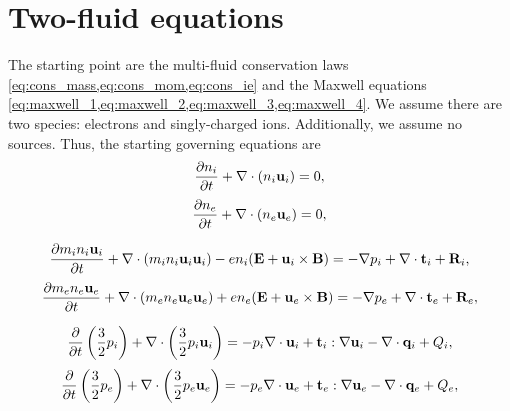 \documentclass[oneside,a4paper,11pt]{report}
\begin{document}
\section{Two-fluid equations}
The starting point are the multi-fluid conservation laws \cref{eq:cons_mass,eq:cons_mom,eq:cons_ie} and the Maxwell equations \cref{eq:maxwell_1,eq:maxwell_2,eq:maxwell_3,eq:maxwell_4}. We assume there are two species: electrons and singly-charged ions. Additionally, we assume no sources. Thus, the starting governing equations are
\begin{equation}
\label{eq:twof_ni}
    \frac{\partial n_i}{\partial t} + \nabla \cdot \left ( n_i \mathbf{u}_i \right ) = 0,
\end{equation}
\begin{equation}
\label{eq:twof_ne}
    \frac{\partial n_e}{\partial t} + \nabla \cdot \left ( n_e \mathbf{u}_e \right ) = 0,
\end{equation}

\begin{equation}
\label{eq:twof_ui}
    \frac{\partial m_i n_i \mathbf{u}_i}{\partial t} + \nabla \cdot \left ( m_i n_i \mathbf{u}_i \mathbf{u}_i \right) - e n_i ( \mathbf{E} + \mathbf{u}_i \times \mathbf{B} ) = - \nabla p_i + \nabla \cdot \mathbf{t}_i + \mathbf{R}_i,
\end{equation}
\begin{equation}
\label{eq:twof_ue}
    \frac{\partial m_e n_e \mathbf{u}_e}{\partial t} + \nabla \cdot \left ( m_e n_e \mathbf{u}_e \mathbf{u}_e \right) + e n_e ( \mathbf{E} + \mathbf{u}_e \times \mathbf{B} ) = - \nabla p_e + \nabla \cdot \mathbf{t}_e + \mathbf{R}_e,
\end{equation}

\begin{equation}
\label{eq:twof_iei}
    \frac{\partial}{\partial t} \left ( \frac{3}{2} p_i \right ) + \nabla \cdot \left ( \frac{3}{2} p_i \mathbf{u}_i \right ) = -p_i \nabla \cdot \mathbf{u}_i + \mathbf{t}_i : \nabla \mathbf{u}_i - \nabla \cdot \mathbf{q}_i + Q_i,
\end{equation}
\begin{equation}
\label{eq:twof_iee}
    \frac{\partial}{\partial t} \left ( \frac{3}{2} p_e \right ) + \nabla \cdot \left ( \frac{3}{2} p_e \mathbf{u}_e \right ) = -p_e \nabla \cdot \mathbf{u}_e + \mathbf{t}_e : \nabla \mathbf{u}_e - \nabla \cdot \mathbf{q}_e + Q_e,
\end{equation}
\end{document}

